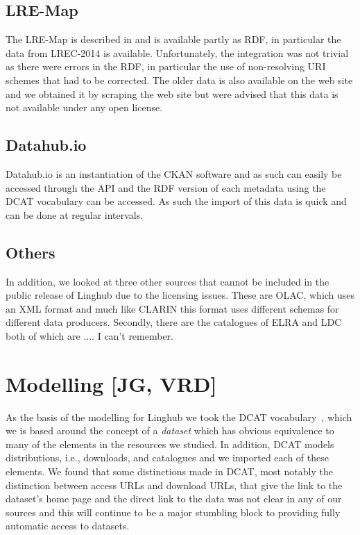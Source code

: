 \documentclass[smallextended]{svjour3}       %
\begin{document}
\subsection{LRE-Map}

The LRE-Map is described in \cite{todo} and is available partly as RDF, in
particular the data from LREC-2014 is available. Unfortunately, the integration
was not trivial as there were errors in the RDF, in particular the use of
non-resolving URI schemes that had to be corrected. The older data is also
available on the web site and we obtained it by scraping the web site but were
advised that this data is not available under any open license.

\subsection{Datahub.io}

Datahub.io is an instantiation of the CKAN software\cite{...} and as such can
easily be accessed through the API and the RDF version of each metadata using
the DCAT vocabulary can be accessed. As such the import of this data is quick
and can be done at regular intervals.

\subsection{Others}

In addition, we looked at three other sources that cannot be included in the
public release of Linghub due to the licensing issues. These are OLAC, which
uses an XML format and much like CLARIN this format uses different schemas for
different data producers. Secondly, there are the catalogues of ELRA and LDC
both of which are .... I can't remember.

\section{Modelling [JG, VRD]}
\label{modelling}

As the basis of the modelling for Linghub we took the DCAT
vocabulary~\cite{dcat}, which we is based around the concept of a \emph{dataset}
which has obvious equivalence to many of the elements in the resources we
studied. In addition, DCAT models distributions, i.e., downloads, and catalogues
and we imported each of these elements. We found that some distinctions made in
DCAT, most notably the distinction between access URLs and download URLs, that
give the link to the dataset's home page and the direct link to the data was not
clear in any of our sources and this will continue to be a major stumbling block
to providing fully automatic access to datasets. 
\end{document}
